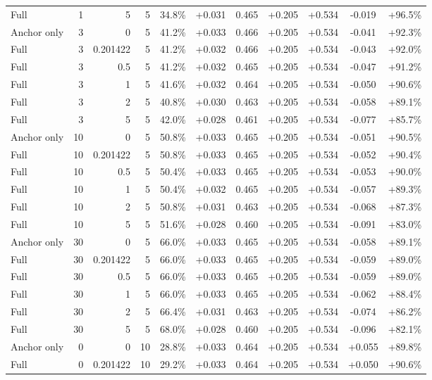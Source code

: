 \begin{table}[htbp]
\begin{tabular}{lrrrccccccc}
Full & 1 & 5 & 5 & 34.8\% & +0.031 & 0.465 & +0.205 & +0.534 & -0.019 & +96.5\% \\
Anchor only & 3 & 0 & 5 & 41.2\% & +0.033 & 0.466 & +0.205 & +0.534 & -0.041 & +92.3\% \\
Full & 3 & 0.201422 & 5 & 41.2\% & +0.032 & 0.466 & +0.205 & +0.534 & -0.043 & +92.0\% \\
Full & 3 & 0.5 & 5 & 41.2\% & +0.032 & 0.465 & +0.205 & +0.534 & -0.047 & +91.2\% \\
Full & 3 & 1 & 5 & 41.6\% & +0.032 & 0.464 & +0.205 & +0.534 & -0.050 & +90.6\% \\
Full & 3 & 2 & 5 & 40.8\% & +0.030 & 0.463 & +0.205 & +0.534 & -0.058 & +89.1\% \\
Full & 3 & 5 & 5 & 42.0\% & +0.028 & 0.461 & +0.205 & +0.534 & -0.077 & +85.7\% \\
Anchor only & 10 & 0 & 5 & 50.8\% & +0.033 & 0.465 & +0.205 & +0.534 & -0.051 & +90.5\% \\
Full & 10 & 0.201422 & 5 & 50.8\% & +0.033 & 0.465 & +0.205 & +0.534 & -0.052 & +90.4\% \\
Full & 10 & 0.5 & 5 & 50.4\% & +0.033 & 0.465 & +0.205 & +0.534 & -0.053 & +90.0\% \\
Full & 10 & 1 & 5 & 50.4\% & +0.032 & 0.465 & +0.205 & +0.534 & -0.057 & +89.3\% \\
Full & 10 & 2 & 5 & 50.8\% & +0.031 & 0.463 & +0.205 & +0.534 & -0.068 & +87.3\% \\
Full & 10 & 5 & 5 & 51.6\% & +0.028 & 0.460 & +0.205 & +0.534 & -0.091 & +83.0\% \\
Anchor only & 30 & 0 & 5 & 66.0\% & +0.033 & 0.465 & +0.205 & +0.534 & -0.058 & +89.1\% \\
Full & 30 & 0.201422 & 5 & 66.0\% & +0.033 & 0.465 & +0.205 & +0.534 & -0.059 & +89.0\% \\
Full & 30 & 0.5 & 5 & 66.0\% & +0.033 & 0.465 & +0.205 & +0.534 & -0.059 & +89.0\% \\
Full & 30 & 1 & 5 & 66.0\% & +0.033 & 0.465 & +0.205 & +0.534 & -0.062 & +88.4\% \\
Full & 30 & 2 & 5 & 66.4\% & +0.031 & 0.463 & +0.205 & +0.534 & -0.074 & +86.2\% \\
Full & 30 & 5 & 5 & 68.0\% & +0.028 & 0.460 & +0.205 & +0.534 & -0.096 & +82.1\% \\
Anchor only & 0 & 0 & 10 & 28.8\% & +0.033 & 0.464 & +0.205 & +0.534 & +0.055 & +89.8\% \\
Full & 0 & 0.201422 & 10 & 29.2\% & +0.033 & 0.464 & +0.205 & +0.534 & +0.050 & +90.6\% \\

\end{tabular}
\end{table}
